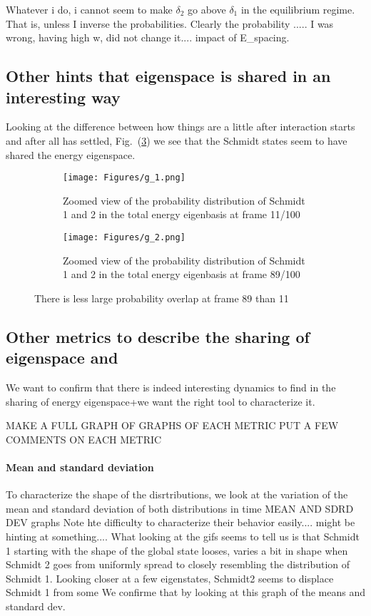 \documentclass{article}
\begin{document}
Whatever i do, i cannot seem to make $\delta_2$ go above $\delta_1$ in the equilibrium regime. That is, unless I inverse the probabilities. 
Clearly the probability .....
I was wrong, having high w, did not change it....
impact of E_spacing.

\subsection{Other hints that eigenspace is shared in an interesting way}

Looking at the difference between how things are a little after interaction starts and after all has settled, Fig.~(\ref{fig:gif_compare}) we see that the Schmidt states seem to have shared the energy eigenspace.

\begin{figure}[h!]
  \centering
  \begin{subfigure}[b]{0.4\linewidth}
    \texttt{[image: Figures/g\_1.png]}
    \caption{Zoomed view of the probability distribution of Schmidt 1 and 2 in the total energy eigenbasis at frame 11/100}
    \label{fig:1}
  \end{subfigure}
  \begin{subfigure}[b]{0.4\linewidth}
    \texttt{[image: Figures/g\_2.png]}
    \caption{Zoomed view of the probability distribution of Schmidt 1 and 2 in the total energy eigenbasis at frame 89/100}
    \label{fig:2}
  \end{subfigure}
  \caption{There is less large probability overlap at frame 89 than 11}
  \label{fig:gif_compare}
\end{figure}

\subsection{Other metrics to describe the sharing of eigenspace and }
We want to confirm that there is indeed interesting dynamics to find in the sharing of energy eigenspace+we want the right tool to characterize it.

MAKE A FULL GRAPH OF GRAPHS OF EACH METRIC
PUT A FEW COMMENTS ON EACH METRIC


\paragraph{Mean and standard deviation}
To characterize the shape of the disrtributions, we look at the variation of the mean and standard deviation of both distributions in time
MEAN AND SDRD DEV graphs
Note hte difficulty to characterize their behavior easily.... might be hinting at something....
What looking at the gifs seems to tell us is that Schmidt 1 starting with the shape of the global state looses, varies a bit in shape when Schmidt 2 goes from uniformly spread to closely resembling the distribution of Schmidt 1. Looking closer at a few eigenstates, Schmidt2 seems to displace Schmidt 1 from some 
We confirme that by looking at this graph of the means and standard dev.
\end{document}
